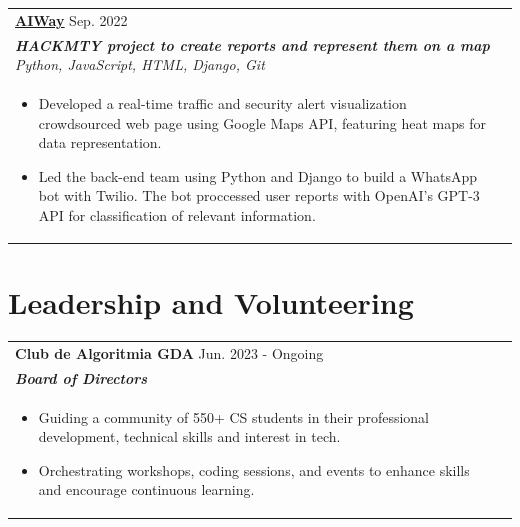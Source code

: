 \documentclass{article}
\begin{document}
\begin{tabularx}{\linewidth}{ @{}l r@{} }
\color[HTML]{1C033C} \textbf{\uline{\href{https://github.com/}{AIWay}}} \hfill \color[HTML]{371e77} Sep. 2022 \\[4pt]
\color[HTML]{371e77}\textbf{\textit{HACKMTY project to create reports and represent them on a map}} \hfill \color[HTML]{4B28A4} \textit{Python, JavaScript, HTML, Django, Git} \\[5pt]
\begin{minipage}[t]{\linewidth}
    \begin{itemize}[nosep,after=\strut, leftmargin=2em, itemsep=2pt]
        \item Developed a real-time traffic and security alert visualization crowdsourced web page using Google Maps API, featuring heat maps for data representation.
        \item Led the back-end team using Python and Django to build a WhatsApp bot with Twilio. The bot proccessed user reports with OpenAI's GPT-3 API for classification of relevant information.
    \end{itemize}
    \end{minipage}
\end{tabularx}

\section{Leadership and Volunteering}
\begin{tabularx}{\linewidth}{ @{}l r@{} }
\color[HTML]{1C033C} \textbf{Club de Algoritmia GDA} \hfill \color[HTML]{371e77} Jun. 2023 - Ongoing \\[5pt]
\color[HTML]{371e77}\textbf{\textit{Board of Directors}} \\[5pt]
\begin{minipage}[t]{\linewidth}
    \begin{itemize}[nosep,after=\strut, leftmargin=2em, itemsep=2pt]
        \item Guiding a community of 550+ CS students in their professional development, technical skills and interest in tech.
        \item Orchestrating workshops, coding sessions, and events to enhance skills and encourage continuous learning.
    \end{itemize}
\end{minipage}
\end{tabularx}
\end{document}
